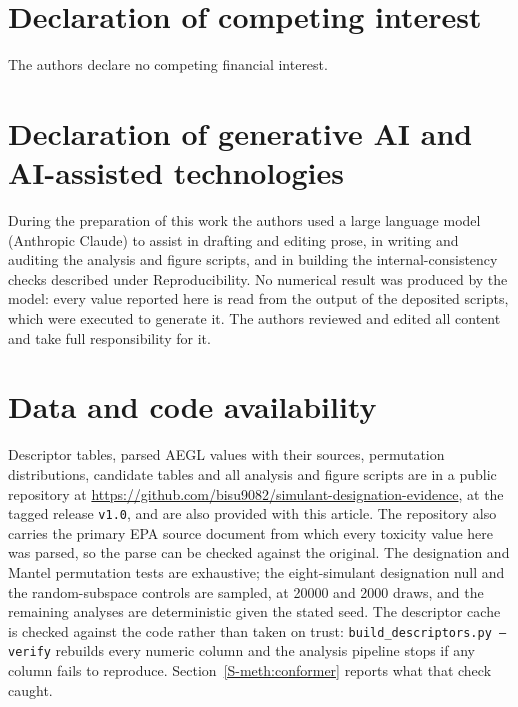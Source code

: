 \documentclass[1p,times]{elsarticle}
\begin{document}
\section*{Declaration of competing interest}
The authors declare no competing financial interest.

\section*{Declaration of generative AI and AI-assisted technologies}
During the preparation of this work the authors used a large language model
(Anthropic Claude) to assist in drafting and editing prose, in writing and
auditing the analysis and figure scripts, and in building the
internal-consistency checks described under Reproducibility. No numerical
result was produced by the model: every value reported here is read from the
output of the deposited scripts, which were executed to generate it. The
authors reviewed and edited all content and take full responsibility for it.

\section*{Data and code availability}
Descriptor tables, parsed AEGL values with their sources, permutation
distributions, candidate tables and all analysis and figure scripts are in a
public repository at
\url{https://github.com/bisu9082/simulant-designation-evidence}, at the tagged
release \texttt{v1.0}, and are also provided with this article. The repository
also carries the primary EPA source document from which every toxicity value
here was parsed, so the parse can be checked against the original. The designation and Mantel
permutation tests are exhaustive; the eight-simulant designation null and the
random-subspace controls are sampled, at 20000 and 2000 draws, and the
remaining analyses are deterministic given the stated seed. The descriptor cache is checked against the code rather
than taken on trust: \texttt{build\_descriptors.py --verify} rebuilds every
numeric column and the analysis pipeline stops if any column fails to
reproduce. Section~\ref{S-meth:conformer} reports what that check caught.


\end{document}
